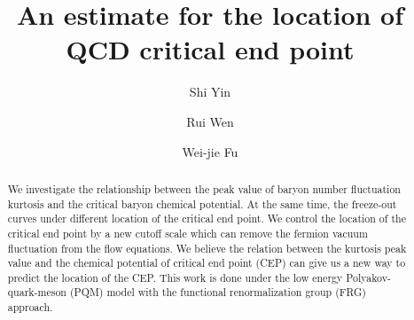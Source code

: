 \documentclass[%
reprint,
superscriptaddress,
showpacs,preprintnumbers,
 amsmath,amssymb,
 aps,
prl,
]{revtex4-1}
\begin{document}
\preprint{}

\title{An estimate for the location of QCD critical end point
}

\author{Shi Yin}

\author{Rui Wen}

\author{Wei-jie Fu}


\begin{abstract}
We investigate the relationship between the peak value of baryon number fluctuation kurtosis and the critical baryon chemical potential. At the same time, the freeze-out curves under different location of the critical end point. We control the location of the critical end point by a new cutoff scale which can remove the fermion vacuum fluctuation from the flow equations. We believe the relation between the kurtosis peak value and the chemical potential of critical end point (CEP) can give us a new way to predict the location of the CEP. This work is done under the low energy Polyakov-quark-meson (PQM) model with the functional renormalization group (FRG) approach.
\end{abstract}
\maketitle
\end{document}
